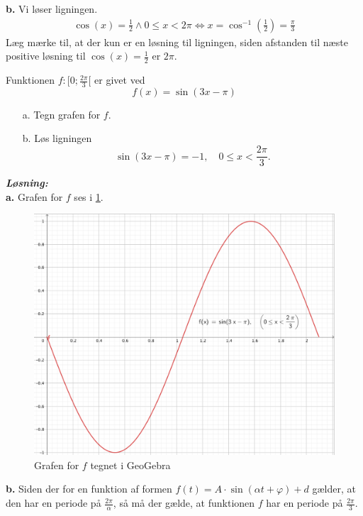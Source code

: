 \documentclass{article}
\newcommand{\sol}{\setlength{\parindent}{0cm}\textbf{\textit{Løsning:}}\setlength{\parindent}{1cm}}
\begin{document}
\noindent \textbf{b.} Vi løser ligningen.
\begin{equation*}
\begin{split}
  \cos(x)=\frac{1}{2} \land 0\leq x < 2\pi \iff x=\cos^{-1}\left(\frac{1}{2}\right) = \frac{\pi}{3}
\end{split}
\end{equation*}
Læg mærke til, at der kun er en løsning til ligningen, siden afstanden til næste positive løsning til $\cos(x)=\frac{1}{2}$ er $2\pi$.
\begin{question}{}{}
  Funktionen $f:[0;\frac{2\pi}{3}[$ er givet ved
  \[
  f(x)= \sin \left(3x-\pi\right) 
  \] 
  \begin{itemize}
  \item[a.] Tegn grafen for $f$.
  \item[b.] Løs ligningen
  \[
  \sin \left(3x-\pi\right) =-1, \quad 0\leq x < \frac{2\pi}{3}.
  \] 
  \end{itemize}
\end{question}
\sol \\ 
\textbf{a.} Grafen for $f$ ses i \cref{fig:sin}.
\begin{figure}[H]
\begin{center}
  \includegraphics[width=\textwidth]{graf2.png}
\end{center}
\caption{Grafen for $f$ tegnet i GeoGebra }
\label{fig:sin}
\end{figure}
\noindent \textbf{b.} 
Siden der for en funktion af formen $f(t)= A\cdot \sin \left(\alpha t+\varphi\right)+d$ gælder, at den har en periode på $\frac{2\pi}{\alpha}$, så må der gælde, at funktionen $f$ har en periode på $\frac{2\pi}{3}$. 
\end{document}

